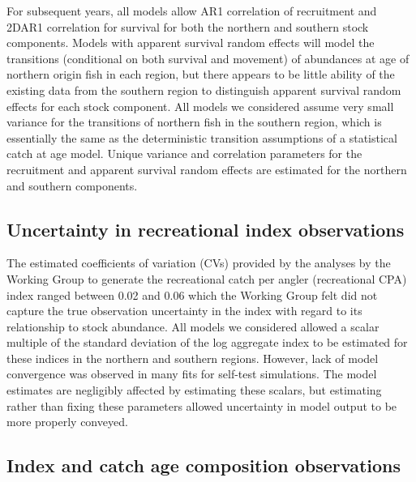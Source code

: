 \documentclass[
]{article}
\begin{document}
For subsequent years, all models allow AR1 correlation of recruitment
and 2DAR1 correlation for survival for both the northern and southern
stock components. Models with apparent survival random effects will
model the transitions (conditional on both survival and movement) of
abundances at age of northern origin fish in each region, but there
appears to be little ability of the existing data from the southern
region to distinguish apparent survival random effects for each stock
component. All models we considered assume very small variance for the
transitions of northern fish in the southern region, which is
essentially the same as the deterministic transition assumptions of a
statistical catch at age model. Unique variance and correlation
parameters for the recruitment and apparent survival random effects are
estimated for the northern and southern components.

\hypertarget{uncertainty-in-recreational-index-observations}{%
\subsection*{Uncertainty in recreational index
observations}\label{uncertainty-in-recreational-index-observations}}

The estimated coefficients of variation (CVs) provided by the analyses
by the Working Group to generate the recreational catch per angler
(recreational CPA) index ranged between 0.02 and 0.06 which the Working
Group felt did not capture the true observation uncertainty in the index
with regard to its relationship to stock abundance. All models we
considered allowed a scalar multiple of the standard deviation of the
log aggregate index to be estimated for these indices in the northern
and southern regions. However, lack of model convergence was observed in
many fits for self-test simulations. The model estimates are negligibly
affected by estimating these scalars, but estimating rather than fixing
these parameters allowed uncertainty in model output to be more properly
conveyed.

\hypertarget{index-and-catch-age-composition-observations}{%
\subsection*{Index and catch age composition
observations}\label{index-and-catch-age-composition-observations}}
\end{document}
